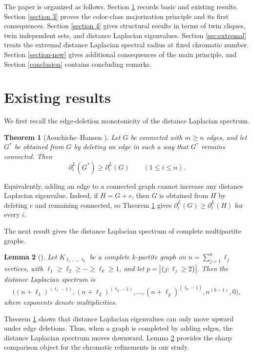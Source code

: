 \documentclass[12pt]{article}
\theoremstyle{plain}
\newtheorem{theorem}{Theorem}[section]
\newtheorem{lemma}[theorem]{Lemma}
\theoremstyle{definition}
\begin{document}
The paper is organized as follows. Section \ref{section 2} records basic and existing results. Section \ref{section 3} proves the
color-class majorization principle and its first consequences. Section \ref{section 4} gives structural results in terms of twin
cliques, twin independent sets, and distance Laplacian eigenvalues. Section \ref{sec:extremal} treats the extremal distance
Laplacian spectral radius at fixed chromatic number.
Section \ref{section-new} gives additional consequences of the main principle, and Section \ref{conclusion} contains concluding
remarks.

\section{Existing results}\label{section 2}

We first recall the edge-deletion monotonicity of the distance Laplacian spectrum.

\begin{theorem}[Aouchiche--Hansen \cite{AouchicheHansen2013}]\label{thm:monotone}
Let $G$ be connected with $m\ge n$ edges, and let $G^\ast$ be obtained from $G$ by deleting an edge in such a way that
$G^\ast$ remains connected. Then
\[
    \partial^{L}_i(G^\ast)\ge \partial^{L}_i(G)\qquad (1\le i\le n).
\]
\end{theorem}

\noindent Equivalently, adding an edge to a connected graph cannot increase any distance Laplacian eigenvalue. Indeed, if $H=G+e$, then
$G$ is obtained from $H$ by deleting $e$ and remaining connected, so Theorem \ref{thm:monotone} gives
$\partial_i^L(G)\ge \partial_i^L(H)$ for every $i$.

\medskip
\noindent The next result gives the distance Laplacian spectrum of complete multipartite graphs.

\begin{lemma}[\cite{BilalsurveyDL}]\label{lem:multipartite-spectrum}
Let $K_{\ell_1,\dots,\ell_k}$ be a complete $k$-partite graph on $n=\sum_{j=1}^k \ell_j$ vertices, with
$\ell_1\ge\ell_2\ge\cdots\ge\ell_k\ge 1$, and let $p=|\{j:\ell_j\ge 2\}|.$ 
Then the distance Laplacian spectrum is
\[
    \Big( (n+\ell_1)^{(\ell_1-1)},(n+\ell_2)^{(\ell_2-1)},\dots,(n+\ell_p)^{(\ell_p-1)},n^{(k-1)},0\Big),
\]
where exponents denote multiplicities.
\end{lemma}

\noindent Theorem \ref{thm:monotone} shows that distance Laplacian eigenvalues can only move upward under edge deletions. Thus, when a graph is completed by adding edges, the distance Laplacian spectrum moves downward. Lemma \ref{lem:multipartite-spectrum}
provides the sharp comparison object for the chromatic refinements in our study.
\end{document}
